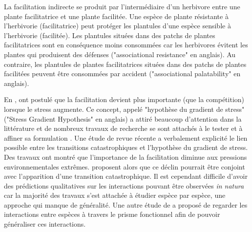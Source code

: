 \documentclass[12pt]{article} %
\begin{document}
La facilitation indirecte se produit par l'intermédiaire d'un herbivore entre une plante facilitatrice et une plante facilitée. Une espèce de plante résistante à l'herbivorie (facilitatrice) peut protéger les plantules d'une espèce sensible à l'herbivorie (facilitée). Les plantules situées dans des patchs de plantes facilitatrices sont en conséquence moins consommées car les herbivores évitent les plantes qui produisent des défenses ("associational resistance" en anglais). Au contraire, les plantules de plantes facilitatrices situées dans des patchs de plantes facilitées peuvent être consommées par accident ("associational palatability" en anglais).

En \citeyear{Bertness1994}, \citeauthor{Bertness1994} ont postulé que la facilitation devient plus importante (que la compétition) lorsque le stress augmente. Ce concept, appelé "hypothèse du gradient de stress" ("Stress Gradient Hypothesis" en anglais) a attiré beaucoup d'attention dans la littérature et de nombreux travaux de recherche se sont attachés à le tester et à affiner sa formulation \citep{ Anthelme2007,Maestre2009,He2013}. Une étude de revue récente \citep{Verwijmeren2013} a verbalement explicité le lien possible entre les transitions catastrophiques et l'hypothèse du gradient de stress. Des travaux ont montré que l'importance de la facilitation diminue aux pressions environnementales extrêmes. \citet{Verwijmeren2013} proposent alors que ce déclin pourrait être conjoint avec l'apparition d'une transition catastrophique. Il est cependant difficile d'avoir des prédictions qualitatives sur les interactions pouvant être observées \textit{in natura} car la majorité des travaux s'est attachée à étudier espèce par espèce, une approche qui manque de généralité. Une autre étude de \citet{Butterfield2013} a proposé de regarder les interactions entre espèces à travers le prisme fonctionnel afin de pouvoir généraliser ces interactions. 
\end{document}
